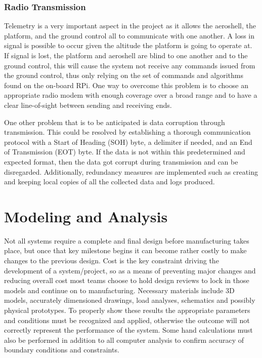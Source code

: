 \subsubsection*{Radio Transmission}

\indent\indent Telemetry is a very important aspect in the project as it allows the aeroshell, the platform, and the ground control all to communicate with one another. A loss in signal is possible to occur given the altitude the platform is going to operate at. If signal is lost, the platform and aeroshell are blind to one another and to the ground control, this will cause the system not receive any commands issued from the ground control, thus only relying on the set of commands and algorithms found on the on-board RPi. One way to overcome this problem is to choose an appropriate radio modem with enough coverage over a broad range and to have a clear line-of-sight between sending and receiving ends.

One other problem that is to be anticipated is data corruption through transmission. This could be resolved by establishing a thorough communication protocol with a Start of Heading (SOH) byte, a delimiter if needed, and an End of Transmission (EOT) byte. If the data is not within this predetermined and expected format, then the data got corrupt during transmission and can be disregarded. Additionally, redundancy measures are implemented such as creating and keeping local copies of all the collected data and logs produced.





\section{Modeling and Analysis}

\indent\indent Not all systems require a complete and final design before manufacturing takes place, but once that key milestone begins it can become rather costly to make changes to the previous design. Cost is the key constraint driving the development of a system/project, so as a means of preventing major changes and reducing overall cost most teams choose to hold design reviews to lock in those models and continue on to manufacturing. Necessary materials include 3D models, accurately dimensioned drawings, load analyses, schematics and possibly physical prototypes. To properly show these results the appropriate parameters and conditions must be recognized and applied, otherwise the outcome will not correctly represent the performance of the system. Some hand calculations must also be performed in addition to all computer analysis to confirm accuracy of boundary conditions and constraints.

